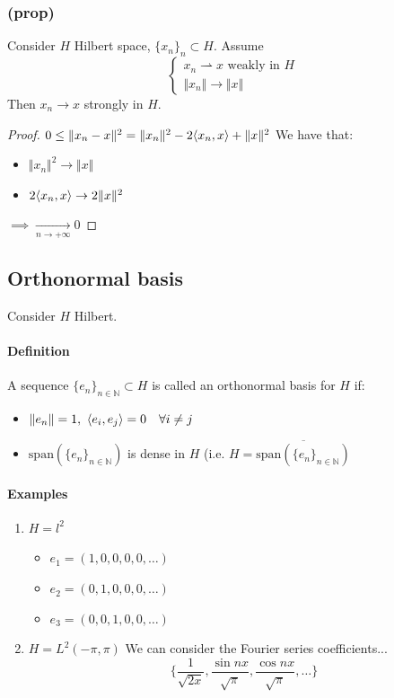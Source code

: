\subsubsection{(prop)}
Consider $H$ Hilbert space, $\{x_n\}_n\subset H$. Assume 
$$\begin{cases}
    x_n\rightharpoonup x\text{ weakly in } H\\
    \Vert x_n\Vert \to \Vert x\Vert
\end{cases}$$
Then $x_n\to x$ strongly in $H$.
\begin{proof}
    $0\leq \Vert x_n-x\Vert ^2=\Vert x_n\Vert^2-2\langle {x_n} , {x} \rangle +\Vert x\Vert ^2$
    We have that:
    \begin{itemize}
        \item $\Vert x_n\Vert^2\to \Vert x\Vert$
        \item $2\langle {x_n} , {x} \rangle \to 2\Vert x\Vert^2$
    \end{itemize}
    $\implies \xrightarrow[n\to+\infty]{}0$
\end{proof}
\subsection{Orthonormal basis}
Consider $H$ Hilbert.\\
\paragraph{Definition}
A sequence $\{ e_n\}_{n\in \mathbb N}\subset H$ is called an orthonormal basis for $H$ if:
\begin{itemize}
    \item $\Vert e_n\Vert =1, \ \scalar{e_i}{e_j}=0\quad \forall i\neq j$
    \item $\mathrm{span}(\{e_n\}_{n\in \mathbb N})$ is dense in $H$ (i.e. $H=\overline{\mathrm{span}(\{e_n\}_{n\in \mathbb N})}$
\end{itemize}
\paragraph{Examples}

\begin{enumerate}
    \item $H=l^2$
\begin{itemize}
    \item $e_1=(1,0,0,0,0,\dots)$
        \item $e_2=(0,1,0,0,0,\dots)$
    \item $e_3=(0,0,1,0,0,\dots)$

\end{itemize}
\item $H=L^2(-\pi,\pi)$
We can consider the Fourier series coefficients...
$$\Big\{\frac 1{\sqrt {2x}},\frac{\sin nx}{\sqrt{\pi}},\frac{\cos nx}{\sqrt{\pi}},\dots\Big\}$$
\end{enumerate}
